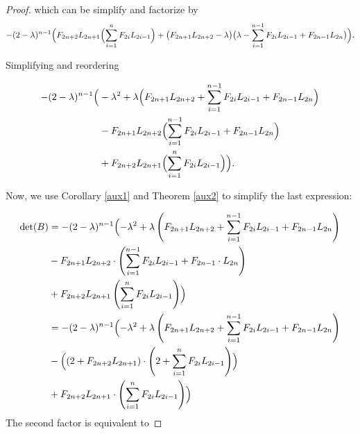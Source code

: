 \documentclass[10pt,a4paper]{amsart}
\begin{document}
\begin{proof}
\noindent which can be simplify and factorize by 
\[
-(2-\lambda)^{n-1}\Bigl(
F_{2n+2}L_{2n+1}\Bigl( \sum_{i=1}^{n} F_{2i}L_{2i-1} \Bigr)
+\bigl(F_{2n+1}L_{2n+2}-\lambda\bigr)
\bigl(\lambda-\sum_{i=1}^{n-1}F_{2i}L_{2i-1}+F_{2n-1}L_{2n}\bigr)
\Bigr).
\]

\noindent Simplifying and reordering 

\[
\begin{aligned}
-(2-\lambda)^{n-1}\Bigl(
&-\lambda^{2}
+ \lambda\Bigl(
F_{2n+1}L_{2n+2}
+ \sum_{i=1}^{n-1} F_{2i}L_{2i-1}
+ F_{2n-1}L_{2n}
\Bigr) \\
&- F_{2n+1}L_{2n+2}
\Bigl(
\sum_{i=1}^{n-1} F_{2i}L_{2i-1}
+ F_{2n-1}L_{2n}
\Bigr) \\
&+ F_{2n+2}L_{2n+1}
\Bigl(
\sum_{i=1}^{n} F_{2i}L_{2i-1}
\Bigr)
\Bigr).
\end{aligned}
\]




\noindent Now, we use Corollary \ref{aux1} and Theorem \ref{aux2} to simplify the last expression: 

\begin{align*}
\operatorname{det}(B)&=-(2-\lambda)^{n-1} \Bigl( -\lambda^2+\lambda\left(F_{2 n+1} L_{2 n+2}+\sum_{i=1}^{n-1} F_{2 i} L_{2 i-1}+F_{2 n-1} L_{2 n}\right)\\
&-F_{2 n+1} L_{2 n+2} \cdot\left(\sum_{i=1}^{n-1} F_{2 i} L_{2 i-1}+F_{2 n-1} \cdot L_{2 n}\right)\\ 
&+F_{2 n+2} L_{2 n+1}\left(\sum_{i=1}^n F_{2 i} L_{2 i-1}\right)\Bigr)\\
&= -(2-\lambda)^{n-1} \Bigl(-\lambda^2+\lambda\left(F_{2 n+1} L_{2 n+2}+\sum_{i=1}^{n-1} F_{2i} L_{2 i-1}+F_{2 n-1} L_{2 n}\right)\\
&-\Bigl(\left(2+F_{2 n+2} L_{2 n+1}\right) \cdot\left(2+\sum_{i=1}^n F_{2 i} L_{2 i-1}\right)\Bigr) \\
&  +F_{2 n+2} L_{2 n+1} \cdot\left(\sum_{i=1}^n F_{2 i} L_{2 i-1}\right)\Bigr)
\end{align*}
\normalcolor
The second factor is equivalent to 


\end{proof}
\end{document}
